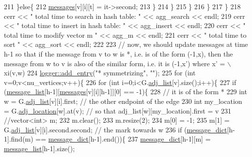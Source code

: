 \begin{DoxyCode}
211           \}\textcolor{keywordflow}{else}\{
212             \hyperlink{classgraph__message_aac77e098f0acf9650116a8e51fe3b4b7}{messages}[v][i][t] = it->second;
213           \}
214         \}
215       \}
216     \}
217   \}
218   cerr << \textcolor{stringliteral}{" total time to search in hash table: "} << agg\_search << endl;
219   cerr << \textcolor{stringliteral}{" total time to insert in hash table: "} << agg\_insert << endl;
220   cerr << \textcolor{stringliteral}{" total time to modify vector m  "} << agg\_m << endl;
221   cerr << \textcolor{stringliteral}{" total time to sort  "} << agg\_sort << endl;
222 
223   \textcolor{comment}{// now, we should update messages at time h-1 so that if the message from v to w is *, i.e. is of the
       form (-1,x), then the message from w to v is also of the similar form, i.e. it is (-1,x') where x' = \(\backslash\)xi(v,w)}
224   \hyperlink{classlogger_a710163deb17bc81f70d53d285b8ac9ac}{logger::add\_entry}(\textcolor{stringliteral}{"* symmetrizing"}, \textcolor{stringliteral}{""});
225   \textcolor{keywordflow}{for} (\textcolor{keywordtype}{int} v=0;v<nu\_vertices;v++)\{
226     \textcolor{keywordflow}{for} (\textcolor{keywordtype}{int} i=0;i<G.\hyperlink{classmarked__graph_a1a0bf7ca413a278763f7c878b3b6fd6f}{adj\_list}[v].size();i++)\{
227       \textcolor{keywordflow}{if} (\hyperlink{classgraph__message_aa17fdb629b423343edfafa97252763ef}{message\_list}[h-1][\hyperlink{classgraph__message_aac77e098f0acf9650116a8e51fe3b4b7}{messages}[v][i][h-1]][0] == -1)\{
228         \textcolor{comment}{// it is of the form *}
229         \textcolor{keywordtype}{int} w = G.\hyperlink{classmarked__graph_a1a0bf7ca413a278763f7c878b3b6fd6f}{adj\_list}[v][i].first; \textcolor{comment}{// the other endpoint of the edge}
230         \textcolor{keywordtype}{int} my\_location = G.\hyperlink{classmarked__graph_a3ae722ea9583ad23af34d789a88ac01a}{adj\_location}[w].at(v); \textcolor{comment}{// so that adj\_list[w][my\_location].first =
       v}
231         \textcolor{comment}{//vector<int> m;}
232         m.clear();
233         m.resize(2);
234         m[0] = -1;
235         m[1] = G.\hyperlink{classmarked__graph_a1a0bf7ca413a278763f7c878b3b6fd6f}{adj\_list}[v][i].second.second; \textcolor{comment}{// the mark towards w}
236         \textcolor{keywordflow}{if} (\hyperlink{classgraph__message_ab54d89b122c2b1322da0d5db2043fb84}{message\_dict}[h-1].find(m) == \hyperlink{classgraph__message_ab54d89b122c2b1322da0d5db2043fb84}{message\_dict}[h-1].end())\{
237           \hyperlink{classgraph__message_ab54d89b122c2b1322da0d5db2043fb84}{message\_dict}[h-1][m] = \hyperlink{classgraph__message_aa17fdb629b423343edfafa97252763ef}{message\_list}[h-1].size();

\end{DoxyCode}
